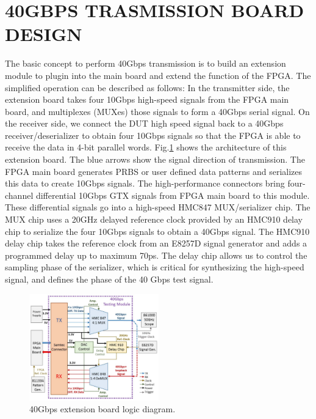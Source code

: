 \documentclass{article}
\begin{document}
\section{40GBPS TRASMISSION BOARD DESIGN}
The basic concept to perform 40Gbps transmission is to build an extension module to plugin into the main board and extend the function of the FPGA. The simplified operation can be described as follows: In the transmitter side, the extension board takes four 10Gbps high-speed signals from the FPGA main board, and multiplexes (MUXes) those signals to form a 40Gbps serial signal. On the receiver side, we connect the DUT high speed signal back to a 40Gbps receiver/deserializer to obtain four 10Gbps signals so that the FPGA is able to receive the data in 4-bit parallel words. Fig.\ref{fig:fig2} shows the architecture of this extension board. The blue arrows show the signal direction of transmission. The FPGA main board generates PRBS or user defined data patterns and serializes this data to create 10Gbps signals. The high-performance connectors bring four-channel differential 10Gbps GTX signals from FPGA main board to this module. These differential signals go into a high-speed HMC847 MUX/serializer chip. The MUX chip uses a 20GHz delayed reference clock provided by an HMC910 delay chip to serialize the four 10Gbps signals to obtain a 40Gbps signal. The HMC910 delay chip takes the reference clock from an E8257D signal generator and adds a programmed delay up to maximum 70ps. The delay chip allows us to control the sampling phase of the serializer, which is critical for synthesizing the high-speed signal, and defines the phase of the 40 Gbps test signal. 

\begin{figure}
\centering
\includegraphics[width=0.5\textwidth]{fig2.png}
\caption{\label{fig:fig2}40Gbps extension board logic diagram.}
\end{figure}
\end{document}
